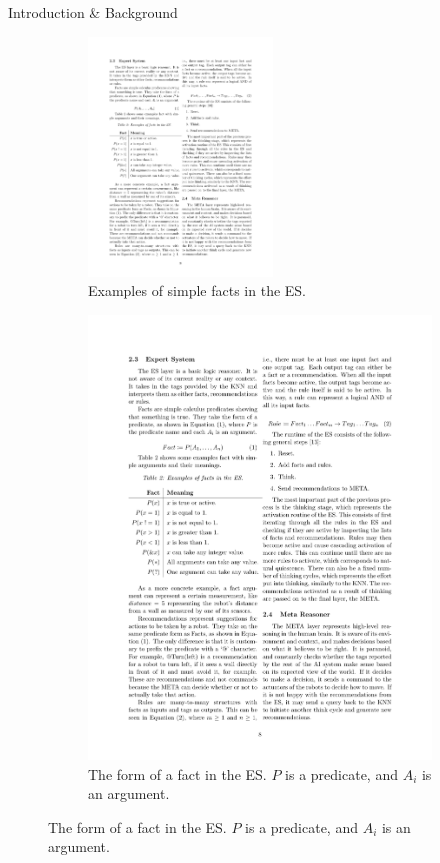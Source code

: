 \documentclass[final]{beamer} %
\begin{document}
\begin{frame}
\begin{columns}
\begin{column}{.33\textwidth}
{\begin{block}{Introduction \& Background}
{					\begin{figure}[!htb]
						\centering
						\begin{subfigure}[!htb]{0.4\columnwidth}
							\centering
							\includegraphics[height=2.5in]{figures/fact_examples.pdf}
							\caption{Examples of simple facts in the ES.}
						\end{subfigure}
						\begin{subfigure}[!htb]{0.58\columnwidth}
							\centering
							\includegraphics[width=0.5\columnwidth]{figures/fact.pdf}
							\caption{The form of a fact in the ES. $P$ is a predicate, and $A_i$ is an argument.}
							
							\vspace{1ex}
							

\end{subfigure}
\end{figure}}
\end{block}}
\end{column}
\end{columns}
\end{frame}
\end{document}
